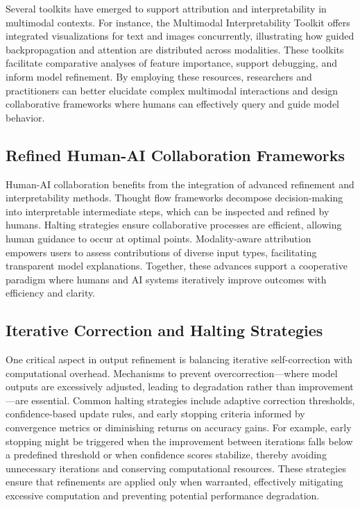 \documentclass[sigconf]{acmart}
\begin{document}
Several toolkits have emerged to support attribution and interpretability in multimodal contexts. For instance, the Multimodal Interpretability Toolkit offers integrated visualizations for text and images concurrently, illustrating how guided backpropagation and attention are distributed across modalities. These toolkits facilitate comparative analyses of feature importance, support debugging, and inform model refinement. By employing these resources, researchers and practitioners can better elucidate complex multimodal interactions and design collaborative frameworks where humans can effectively query and guide model behavior.

\subsection{Refined Human-AI Collaboration Frameworks}

Human-AI collaboration benefits from the integration of advanced refinement and interpretability methods. Thought flow frameworks decompose decision-making into interpretable intermediate steps, which can be inspected and refined by humans. Halting strategies ensure collaborative processes are efficient, allowing human guidance to occur at optimal points. Modality-aware attribution empowers users to assess contributions of diverse input types, facilitating transparent model explanations. Together, these advances support a cooperative paradigm where humans and AI systems iteratively improve outcomes with efficiency and clarity.

\subsection{Iterative Correction and Halting Strategies}
One critical aspect in output refinement is balancing iterative self-correction with computational overhead. Mechanisms to prevent overcorrection—where model outputs are excessively adjusted, leading to degradation rather than improvement—are essential. Common halting strategies include adaptive correction thresholds, confidence-based update rules, and early stopping criteria informed by convergence metrics or diminishing returns on accuracy gains. For example, early stopping might be triggered when the improvement between iterations falls below a predefined threshold or when confidence scores stabilize, thereby avoiding unnecessary iterations and conserving computational resources. These strategies ensure that refinements are applied only when warranted, effectively mitigating excessive computation and preventing potential performance degradation.
\end{document}
